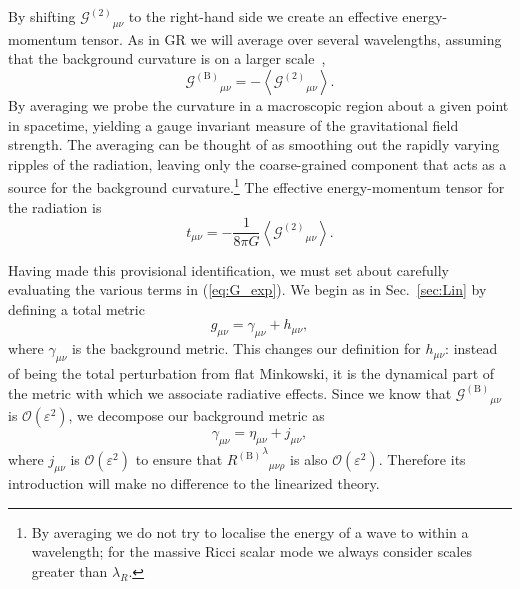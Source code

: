 \documentclass[aps,prd,amsfonts,amssymb,amsmath,nofootinbib,reprint,showpacs]{revtex4-1}
\newcommand{\eqnref}[1]{(\ref{eq:#1})}
\newcommand{\secref}[1]{Sec.\ \ref{sec:#1}}
\newcommand{\recip}[1]{\ensuremath{\frac{1}{#1}}}
\newcommand{\order}[1]{\ensuremath{\mathcal{O}({#1})}}
\begin{document}
By shifting ${\mathcal{G}^{(2)}}_{\mu\nu}$ to the right-hand side we create an effective energy-momentum tensor. As in GR we will average over several wavelengths, assuming that the background curvature is on a larger scale~\cite{Misner1973, Stein2011},
\begin{equation}
{\mathcal{G}^{(\text{B})}}_{\mu\nu} = -\left\langle{\mathcal{G}^{(2)}}_{\mu\nu}\right\rangle.
\end{equation}
By averaging we probe the curvature in a macroscopic region about a given point in spacetime, yielding a gauge invariant measure of the gravitational field strength. The averaging can be thought of as smoothing out the rapidly varying ripples of the radiation, leaving only the coarse-grained component that acts as a source for the background curvature.\footnote{By averaging we do not try to localise the energy of a wave to within a wavelength; for the massive Ricci scalar mode we always consider scales greater than $\lambda_R$.} The effective energy-momentum tensor for the radiation is
\begin{equation}
t_{\mu\nu} = -\recip{8\pi G}\left\langle{\mathcal{G}^{(\text{2})}}_{\mu\nu}\right\rangle.
\end{equation}

Having made this provisional identification, we must set about carefully evaluating the various terms in \eqnref{G_exp}. We begin as in \secref{Lin} by defining a total metric
\begin{equation}
g_{\mu\nu} = \gamma_{\mu\nu} + h_{\mu\nu},
\end{equation}
where $\gamma_{\mu\nu}$ is the background metric. This changes our definition for $h_{\mu\nu}$: instead of being the total perturbation from flat Minkowski, it is the dynamical part of the metric with which we associate radiative effects. Since we know that ${\mathcal{G}^{(\text{B})}}_{\mu\nu}$ is $\order{\varepsilon^2}$, we decompose our background metric as
\begin{equation}
\gamma_{\mu\nu} = \eta_{\mu\nu} + j_{\mu\nu},
\end{equation}
where $j_{\mu\nu}$ is $\order{\varepsilon^2}$ to ensure that ${{R^{(\text{B})}}^\lambda}_{\mu\nu\rho}$ is also $\order{\varepsilon^2}$. Therefore its introduction will make no difference to the linearized theory.
\end{document}
